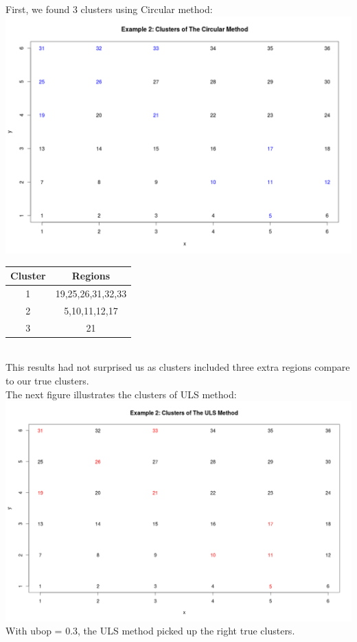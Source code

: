 \documentclass[12pt]{article}
\begin{document}
First, we found 3 clusters using Circular method:\\
\includegraphics[scale=0.2]{Ex2:Circular} \\
\begin{tabular}{|c|c|}
	\hline
	Cluster & Regions \\
	\hline
	1 & 19,25,26,31,32,33 \\
	2 & 5,10,11,12,17 \\ 
	3 & 21 \\ \hline
\end{tabular} \\

This results had not surprised us as clusters included three extra regions compare to our true clusters.\\

The next figure illustrates the clusters of ULS method: \\ 
\includegraphics[scale=0.2]{Ex2:ULS}\\
With ubop = 0.3, the ULS method picked up the right true clusters.\\
\end{document}
